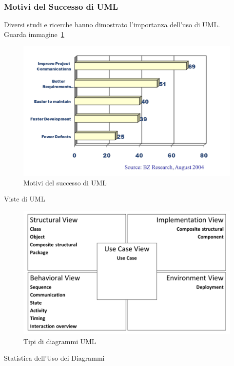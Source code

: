 \documentclass{article}
\begin{document}
	\subsubsection{Motivi del Successo di UML}
	Diversi studi e ricerche hanno dimostrato l’importanza dell’uso di UML.\\
	Guarda immagine~\ref{fig:im-24}
	\begin{figure}[h]
		\centering
		\includegraphics[scale=0.3]{24.succ_uml.png}
		\caption{Motivi del successo di UML}
		\label{fig:im-24}
	\end{figure}
	Viste di UML
	\begin{figure}[h]
		\centering
		\includegraphics[scale=0.3]{25.tipi_uml.png}
		\caption{Tipi di diagrammi UML}
		\label{fig:im-25}
	\end{figure}
	Statistica dell’Uso dei Diagrammi
\end{document}
